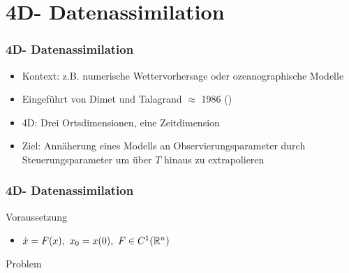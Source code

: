\section[Datenassimilation]{4D- Datenassimilation}
\begin{frame}[<+->]
\frametitle{4D- Datenassimilation}
    \begin{itemize}
     \item Kontext: z.B. numerische Wettervorhersage oder ozeanographische Modelle
     \item Eingeführt von Dimet und Talagrand $\approx$ 1986 (\cite{dimet1986variational})
     \item 4D: Drei Ortsdimensionen, eine Zeitdimension
     \item Ziel: Annäherung eines Modells an Observierungsparameter durch Steuerungsparameter um über $T$ hinaus zu extrapolieren
    \end{itemize}
%     
\pause
\centering

\end{frame}

\begin{frame}
\frametitle{4D- Datenassimilation}
\vspace*{-0.1cm} 
    \begin{block}{Voraussetzung}
    \parbox[c][3.5\baselineskip][t]{\textwidth}{
    \begin{itemize}
     \item $\dot{x} = F(x),~ x_0 = x(0),~F\in C^1(\mathbb R^n)$
    \end{itemize}
    }
    \end{block}
   \vspace*{-0.1cm} 
   \begin{block}{Problem}
   \end{block}
   
\end{frame}

